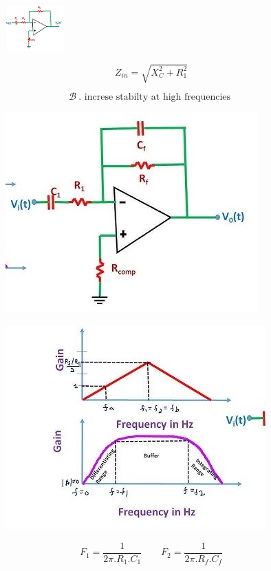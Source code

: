 \documentclass{article}
\begin{document}
\begin{figure}[h]
    \centering
    \includegraphics[width=0.2\textwidth]{practical2.jpg}    
\end{figure}
\[
Z_{in}=\sqrt{X_C^2 + R_1^2}
\]

\[
\mathcal{B} \ \text{. increse stabilty at high frequencies }
\]

\begin{figure}[h]
    \centering
    \includegraphics[width=.3\textwidth]{practical3.jpg}    
\end{figure}

\begin{figure}[h]
    \centering
    \includegraphics[width=.3\textwidth]{practical4.jpg}
\end{figure}

\[
F_1 =\frac{1}{2\pi.R_1.C_1} \qquad
F_2 =\frac{1}{2\pi.R_f.C_f}
\]
\end{document}
